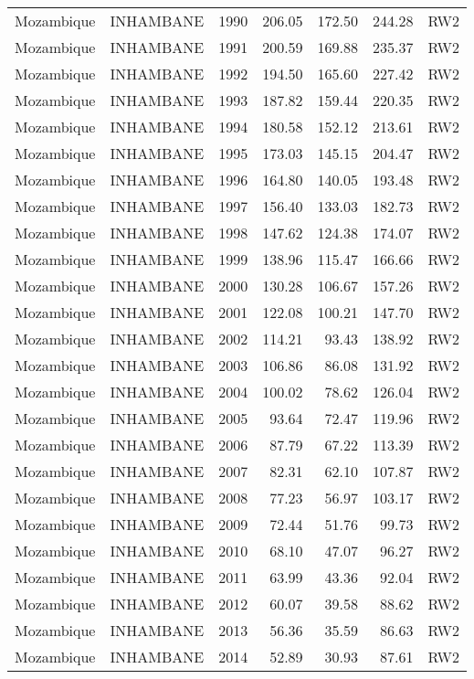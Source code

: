 \begin{longtable}{lllrrrl}
  Mozambique & INHAMBANE & 1990 & 206.05 & 172.50 & 244.28 & RW2 \\ 
  Mozambique & INHAMBANE & 1991 & 200.59 & 169.88 & 235.37 & RW2 \\ 
  Mozambique & INHAMBANE & 1992 & 194.50 & 165.60 & 227.42 & RW2 \\ 
  Mozambique & INHAMBANE & 1993 & 187.82 & 159.44 & 220.35 & RW2 \\ 
  Mozambique & INHAMBANE & 1994 & 180.58 & 152.12 & 213.61 & RW2 \\ 
  Mozambique & INHAMBANE & 1995 & 173.03 & 145.15 & 204.47 & RW2 \\ 
  Mozambique & INHAMBANE & 1996 & 164.80 & 140.05 & 193.48 & RW2 \\ 
  Mozambique & INHAMBANE & 1997 & 156.40 & 133.03 & 182.73 & RW2 \\ 
  Mozambique & INHAMBANE & 1998 & 147.62 & 124.38 & 174.07 & RW2 \\ 
  Mozambique & INHAMBANE & 1999 & 138.96 & 115.47 & 166.66 & RW2 \\ 
  Mozambique & INHAMBANE & 2000 & 130.28 & 106.67 & 157.26 & RW2 \\ 
  Mozambique & INHAMBANE & 2001 & 122.08 & 100.21 & 147.70 & RW2 \\ 
  Mozambique & INHAMBANE & 2002 & 114.21 & 93.43 & 138.92 & RW2 \\ 
  Mozambique & INHAMBANE & 2003 & 106.86 & 86.08 & 131.92 & RW2 \\ 
  Mozambique & INHAMBANE & 2004 & 100.02 & 78.62 & 126.04 & RW2 \\ 
  Mozambique & INHAMBANE & 2005 & 93.64 & 72.47 & 119.96 & RW2 \\ 
  Mozambique & INHAMBANE & 2006 & 87.79 & 67.22 & 113.39 & RW2 \\ 
  Mozambique & INHAMBANE & 2007 & 82.31 & 62.10 & 107.87 & RW2 \\ 
  Mozambique & INHAMBANE & 2008 & 77.23 & 56.97 & 103.17 & RW2 \\ 
  Mozambique & INHAMBANE & 2009 & 72.44 & 51.76 & 99.73 & RW2 \\ 
  Mozambique & INHAMBANE & 2010 & 68.10 & 47.07 & 96.27 & RW2 \\ 
  Mozambique & INHAMBANE & 2011 & 63.99 & 43.36 & 92.04 & RW2 \\ 
  Mozambique & INHAMBANE & 2012 & 60.07 & 39.58 & 88.62 & RW2 \\ 
  Mozambique & INHAMBANE & 2013 & 56.36 & 35.59 & 86.63 & RW2 \\ 
  Mozambique & INHAMBANE & 2014 & 52.89 & 30.93 & 87.61 & RW2 \\ 

\end{longtable}
